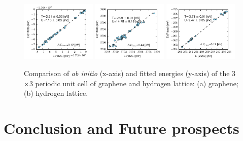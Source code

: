 \documentclass[prl,12pt,onecolumn,nofootinbib,notitlepage,english,superscriptaddress]{revtex4-1}
\newcommand{\HJC}[1]{{\color{RED}{\bf HJC: #1}}}
\begin{document}
\begin{figure}[htb]
\centering
\includegraphics[width=0.32\textwidth]{grp_all_tu.pdf}
\includegraphics[width=0.32\textwidth]{grp_pi_tu.pdf}
\includegraphics[width=0.32\textwidth]{h_tu.pdf}
\caption{Comparison of \textit{ab initio} (x-axis) and fitted energies (y-axis) of the 3$\times$3 periodic unit cell of graphene and hydrogen lattice: (a) graphene; (b) hydrogen lattice.}\label{fig:ne_aidmd_gh}
\end{figure}

\section{Conclusion and Future prospects}
\end{document}
